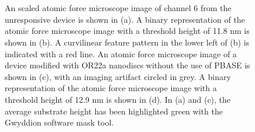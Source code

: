 \documentclass[
  a4paper,
]{scrbook}
\begin{document}
\begin{figure}
\begin{minipage}[t]{0.03\linewidth}
{

}

\end{minipage}%
%
\begin{minipage}[t]{0.01\linewidth}

{\centering 

~

}

\end{minipage}%
%
\begin{minipage}[t]{0.45\linewidth}

{\centering 


}

\end{minipage}%
%
\begin{minipage}[t]{0.01\linewidth}

{\centering 

~

}

\end{minipage}%

\caption{\label{fig-OR22a-variability-AFM-comparison}An scaled atomic
force microscope image of channel 6 from the unresponsive device is
shown in (a). A binary representation of the atomic force microscope
image with a threshold height of 11.8 nm is shown in (b). A curvilinear
feature pattern in the lower left of (b) is indicated with a red line.
An atomic force microscope image of a device modified with OR22a
nanodiscs without the use of PBASE is shown in (c), with an imaging
artifact circled in grey. A binary representation of the atomic force
microscope image with a threshold height of 12.9 nm is shown in (d). In
(a) and (c), the average substrate height has been highlighted green
with the Gwyddion software mask tool.}

\end{figure}
\end{document}
